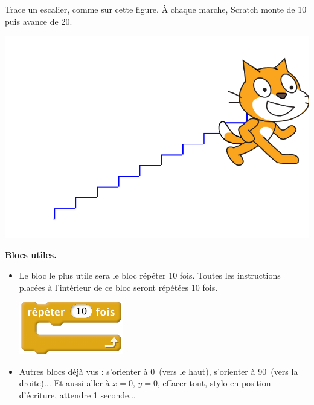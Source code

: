\documentclass[class=report,crop=false, 12pt]{standalone}
\begin{document}




\bigskip
\bigskip


\begin{activite}
Trace un escalier, comme sur cette figure. À chaque marche, Scratch monte de 10 puis avance de 20.

\begin{center}
  \includegraphics[scale=\scaleecran]{ecran-02-ex1}   
\end{center}

\textbf{Blocs utiles.}
\begin{itemize}
  \item Le bloc le plus utile sera le bloc répéter 10 fois. Toutes les instructions placées à l'intérieur de ce bloc seront répétées 10 fois.
  
\begin{center}
  \includegraphics[scale=\scalebloc,scale=1.3]{bloc-02-ex1}
\end{center} 
  
  \item Autres blocs déjà vus : s’orienter à 0\textdegree\ (vers le haut), s’orienter à 90\textdegree\ (vers la droite)...
Et aussi aller à $x=0$, $y = 0$, effacer tout, stylo en position d’écriture, attendre 1 seconde...
\end{itemize}

\end{activite}
\end{document}
